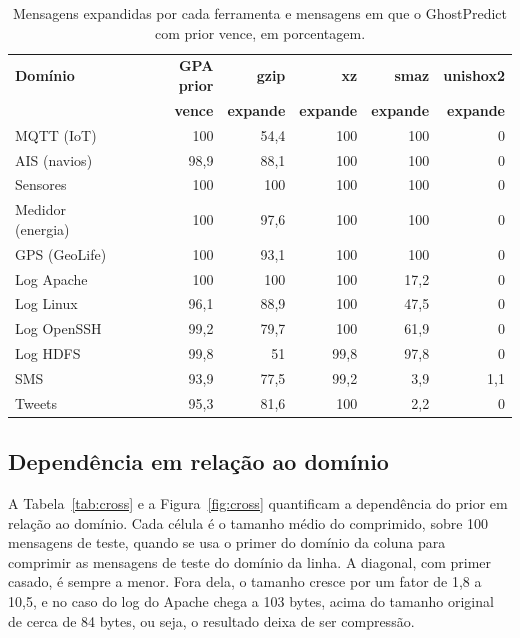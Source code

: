 \documentclass[12pt]{article}
\begin{document}
\begin{table}[ht]
\centering
\caption{Mensagens expandidas por cada ferramenta e mensagens em que o
  GhostPredict com prior vence, em porcentagem.}
\label{tab:inflacao}
\begin{tabular}{lrrrrr}
\toprule
\textbf{Domínio} & \textbf{GPA prior} & \textbf{gzip} & \textbf{xz} &
\textbf{smaz} & \textbf{unishox2} \\
 & \textbf{vence} & \textbf{expande} & \textbf{expande} & \textbf{expande} &
\textbf{expande} \\
\midrule
MQTT (IoT) & 100 & 54,4 & 100 & 100 & 0 \\
AIS (navios) & 98,9 & 88,1 & 100 & 100 & 0 \\
Sensores & 100 & 100 & 100 & 100 & 0 \\
Medidor (energia) & 100 & 97,6 & 100 & 100 & 0 \\
GPS (GeoLife) & 100 & 93,1 & 100 & 100 & 0 \\
Log Apache & 100 & 100 & 100 & 17,2 & 0 \\
Log Linux & 96,1 & 88,9 & 100 & 47,5 & 0 \\
Log OpenSSH & 99,2 & 79,7 & 100 & 61,9 & 0 \\
Log HDFS & 99,8 & 51 & 99,8 & 97,8 & 0 \\
SMS & 93,9 & 77,5 & 99,2 & 3,9 & 1,1 \\
Tweets & 95,3 & 81,6 & 100 & 2,2 & 0 \\
\bottomrule
\end{tabular}
\end{table}

\subsection{Dependência em relação ao domínio}
\label{sec:cross}

A Tabela~\ref{tab:cross} e a Figura~\ref{fig:cross} quantificam a dependência do
prior em relação ao domínio. Cada célula é o tamanho médio do comprimido, sobre 100 mensagens de teste,
quando se usa o primer do domínio da coluna para comprimir as mensagens de teste do
domínio da linha. A diagonal, com primer casado, é sempre a menor. Fora dela, o
tamanho cresce por um fator de 1,8 a 10,5, e no caso do log do Apache chega a 103 bytes,
acima do tamanho original de cerca de 84 bytes, ou seja, o resultado deixa de
ser compressão.
\end{document}
